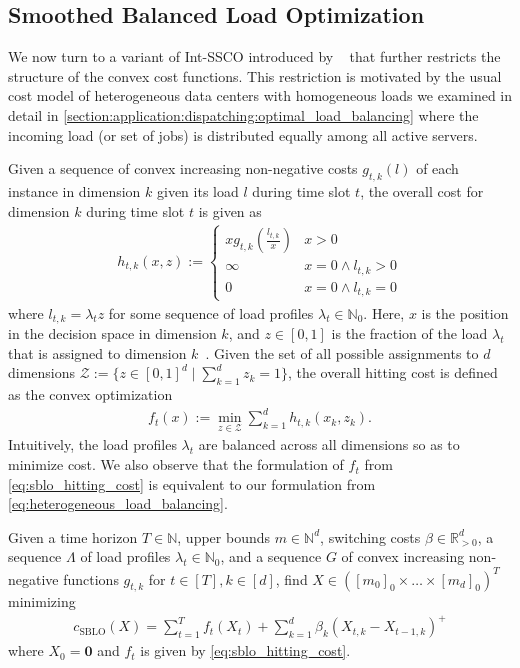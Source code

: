 \subsection{Smoothed Balanced Load Optimization}

We now turn to a variant of Int-SSCO introduced by \citeauthor*{Albers2021_2}~\cite{Albers2021_2} that further restricts the structure of the convex cost functions. This restriction is motivated by the usual cost model of heterogeneous data centers with homogeneous loads we examined in detail in \cref{section:application:dispatching:optimal_load_balancing} where the incoming load (or set of jobs) is distributed equally among all active servers.

Given a sequence of convex increasing non-negative costs $g_{t,k}(l)$ of each instance in dimension $k$ given its load $l$ during time slot $t$, the overall cost for dimension $k$ during time slot $t$ is given as \begin{align*}
    h_{t,k}(x,z) := \begin{cases} 
        x g_{t,k}\left(\frac{l_{t,k}}{x}\right) & x > 0 \\
        \infty                                  & x = 0 \land l_{t,k} > 0 \\
        0                                       & x = 0 \land l_{t,k} = 0
    \end{cases}
\end{align*} where $l_{t,k} = \lambda_t z$ for some sequence of load profiles $\lambda_t \in \mathbb{N}_0$. Here, $x$ is the position in the decision space in dimension $k$, and $z \in [0,1]$ is the fraction of the load $\lambda_t$ that is assigned to dimension $k$~\cite{Albers2021_2}. Given the set of all possible assignments to $d$ dimensions $\mathcal{Z} := \{z \in [0,1]^d \mid \sum_{k=1}^d z_k = 1\}$, the overall hitting cost is defined as the convex optimization \begin{align}
\label{eq:sblo_hitting_cost}
    f_t(x) := \min_{z \in \mathcal{Z}} \sum_{k=1}^d h_{t,k}(x_k,z_k).
\end{align} Intuitively, the load profiles $\lambda_t$ are balanced across all dimensions so as to minimize cost. We also observe that the formulation of $f_t$ from \cref{eq:sblo_hitting_cost} is equivalent to our formulation from \cref{eq:heterogeneous_load_balancing}.

\begin{problem}\label{problem:sblo}
Given a time horizon $T \in \mathbb{N}$, upper bounds $m \in \mathbb{N}^d$, switching costs $\beta \in \mathbb{R}_{>0}^d$, a sequence $\Lambda$ of load profiles $\lambda_t \in \mathbb{N}_0$, and a sequence $G$ of convex increasing non-negative functions $g_{t,k}$ for $t \in [T], k \in [d]$, find $X \in ([m_0]_0 \times \dots \times [m_d]_0)^T$ minimizing \begin{align*}
    c_{\text{SBLO}}(X) = \sum_{t=1}^T f_t(X_t) + \sum_{k=1}^d \beta_k (X_{t,k} - X_{t-1,k})^+
\end{align*}
where $X_0 = \mathbf{0}$ and $f_t$ is given by \cref{eq:sblo_hitting_cost}.
\end{problem}

